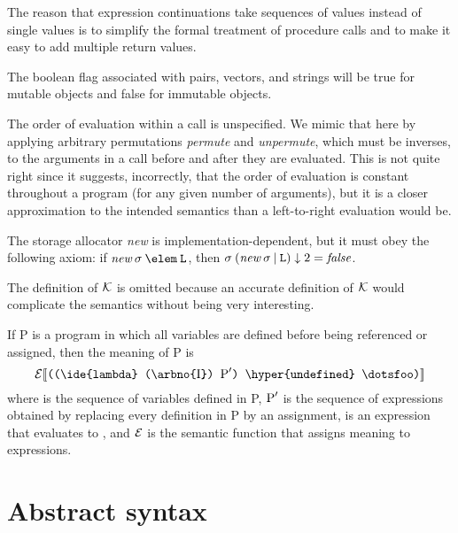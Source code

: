 The reason that expression continuations take sequences of values instead
of single values is to simplify the formal treatment of procedure calls
and to make it easy to add multiple return values.

The boolean flag associated with pairs, vectors, and strings will be true
for mutable objects and false for immutable objects.

The order of evaluation within a call is unspecified.  We mimic that
here by applying arbitrary permutations {\it permute} and {\it
unpermute}, which must be inverses, to the arguments in a call before
and after they are evaluated.  This is not quite right since it suggests,
incorrectly, that the order of evaluation is constant throughout a program (for
any given number of arguments), but it is a closer approximation to the intended
semantics than a left-to-right evaluation would be.

The storage allocator {\it new} is implementation-dependent, but it must
obey the following axiom:  if \hbox{$\fun{new}\:\sigma\:\elem\:\LOC$}, then
$\sigma\:(\fun{new}\:\sigma\:\vert\:\LOC)\elt 2 = {\it false}$.

\def\P{\hbox{\rm P}}
\def\I{\hbox{\rm I}}
\def\Ksem{\hbox{$\cal K$}}
\def\Esem{\hbox{$\cal E$}}

The definition of $\Ksem$ is omitted because an accurate definition of
$\Ksem$ would complicate the semantics without being very interesting.

If \P{} is a program in which all variables are defined before being
referenced or assigned, then the meaning of \P{} is
$$\Esem\sembrack{\hbox{\tt((\ide{lambda} (\arbno{\I}) $\P'$)
\hyper{undefined} \dotsfoo)}}$$
where \arbno{\I} is the sequence of variables defined in \P, $\P'$
is the sequence of expressions obtained by replacing every definition
in \P{} by an assignment,  is an expression that evaluates
to , and
$\Esem$ is the semantic function that assigns meaning to expressions.



\section{Abstract syntax}

\def\K{\hbox{\rm K}}
\def\I{\hbox{\rm I}}
\def\E{\hbox{\rm E}}
\def\C{\hbox{$\Gamma$}}
\def\Con{\hbox{\rm Con}}
\def\Ide{\hbox{\rm Ide}}
\def\Exp{\hbox{\rm Exp}}
\def\Com{\hbox{\rm Com}}
\def\|{$\vert$}


